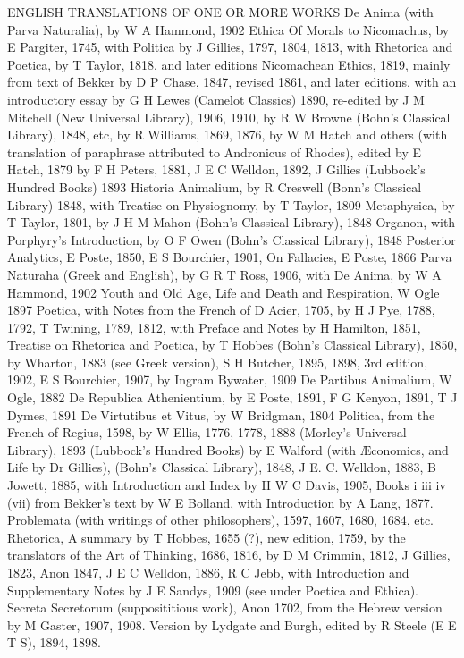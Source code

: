 ENGLISH TRANSLATIONS OF ONE OR MORE WORKS De Anima (with Parva
Naturalia), by W A Hammond, 1902 Ethica Of Morals to Nicomachus, by
E Pargiter, 1745, with Politica by J Gillies, 1797, 1804, 1813, with
Rhetorica and Poetica, by T Taylor, 1818, and later editions Nicomachean
Ethics, 1819, mainly from text of Bekker by D P Chase, 1847, revised
1861, and later editions, with an introductory essay by G H Lewes
(Camelot Classics) 1890, re-edited by J M Mitchell (New Universal
Library), 1906, 1910, by R W Browne (Bohn's Classical Library),
1848, etc, by R Williams, 1869, 1876, by W M Hatch and others (with
translation of paraphrase attributed to Andronicus of Rhodes), edited
by E Hatch, 1879 by F H Peters, 1881, J E C Welldon, 1892, J Gillies
(Lubbock's Hundred Books) 1893 Historia Animalium, by R Creswell (Bonn's
Classical Library) 1848, with Treatise on Physiognomy, by T Taylor,
1809 Metaphysica, by T Taylor, 1801, by J H M Mahon (Bohn's Classical
Library), 1848 Organon, with Porphyry's Introduction, by O F Owen
(Bohn's Classical Library), 1848 Posterior Analytics, E Poste, 1850, E S
Bourchier, 1901, On Fallacies, E Poste, 1866 Parva Naturaha (Greek and
English), by G R T Ross, 1906, with De Anima, by W A Hammond, 1902 Youth
and Old Age, Life and Death and Respiration, W Ogle 1897 Poetica, with
Notes from the French of D Acier, 1705, by H J Pye, 1788, 1792, T
Twining, 1789, 1812, with Preface and Notes by H Hamilton, 1851,
Treatise on Rhetorica and Poetica, by T Hobbes (Bohn's Classical
Library), 1850, by Wharton, 1883 (see Greek version), S H Butcher, 1895,
1898, 3rd edition, 1902, E S Bourchier, 1907, by Ingram Bywater, 1909 De
Partibus Animalium, W Ogle, 1882 De Republica Athenientium, by E Poste,
1891, F G Kenyon, 1891, T J Dymes, 1891 De Virtutibus et Vitus, by W
Bridgman, 1804 Politica, from the French of Regius, 1598, by W Ellis,
1776, 1778, 1888 (Morley's Universal Library), 1893 (Lubbock's Hundred
Books) by E Walford (with Æconomics, and Life by Dr Gillies), (Bohn's
Classical Library), 1848, J E. C. Welldon, 1883, B Jowett, 1885, with
Introduction and Index by H W C Davis, 1905, Books i iii iv (vii)
from Bekker's text by W E Bolland, with Introduction by A Lang, 1877.
Problemata (with writings of other philosophers), 1597, 1607, 1680,
1684, etc. Rhetorica, A summary by T Hobbes, 1655 (?), new edition,
1759, by the translators of the Art of Thinking, 1686, 1816, by D M
Crimmin, 1812, J Gillies, 1823, Anon 1847, J E C Welldon, 1886, R C
Jebb, with Introduction and Supplementary Notes by J E Sandys, 1909 (see
under Poetica and Ethica). Secreta Secretorum (supposititious work),
Anon 1702, from the Hebrew version by M Gaster, 1907, 1908. Version by
Lydgate and Burgh, edited by R Steele (E E T S), 1894, 1898.

